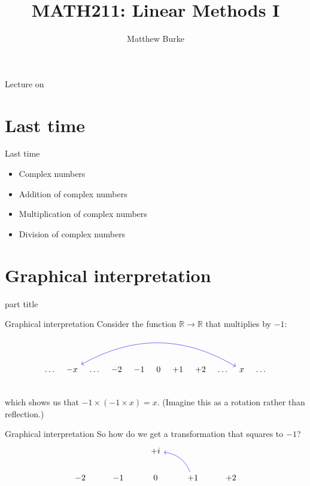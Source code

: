 \documentclass{beamer}
\title{MATH211: Linear Methods I}
\author{Matthew Burke}
\date{\lectureDate}
\newcommand{\lectureDate}{\formatdate{08}{11}{2018}}
\begin{document}
\frame{\titlepage}

\begin{frame}{Lecture on \lectureDate}
  \tableofcontents
\end{frame}

\section*{Last time}
\label{sec:Last-time}

\begin{frame}{Last time}
  \begin{itemize}
  \item Complex numbers\vfill
  \item Addition of complex numbers\vfill
  \item Multiplication of complex numbers\vfill
  \item Division of complex numbers
  \end{itemize}
\end{frame}

\section{Graphical interpretation}

\begin{frame}
\begin{beamercolorbox}[sep=12pt,center]{part title}
\insertsection\par
\end{beamercolorbox}
\end{frame}

\begin{frame}[fragile]{Graphical interpretation}
Consider the function $\mathbb{R} \rightarrow \mathbb{R}$ that multiplies by $-1$:
\begin{equation*}
\begin{tikzcd}[column sep=0.2cm]
&\dots&-x&\dots& -2 & -1  & 0 & +1& +2 & \dots&x\arrow[bend right, color = blue, leftrightarrow]{llllllll}&\dots&\\
\end{tikzcd}
\end{equation*}
which shows us that $-1\times(-1\times x) = x$.\vfill
(Imagine this as a rotation rather than reflection.)
\end{frame}

\begin{frame}[fragile]{Graphical interpretation}
So how do we get a transformation that squares to $-1$?
\begin{equation*}
\begin{tikzcd}
{} & {} & +i & {} & {}\\
-2 & -1 & 0 & +1 \arrow[bend right, color = blue]{ul} & +2\\
\end{tikzcd}
\end{equation*}
\end{frame}
\end{document}
